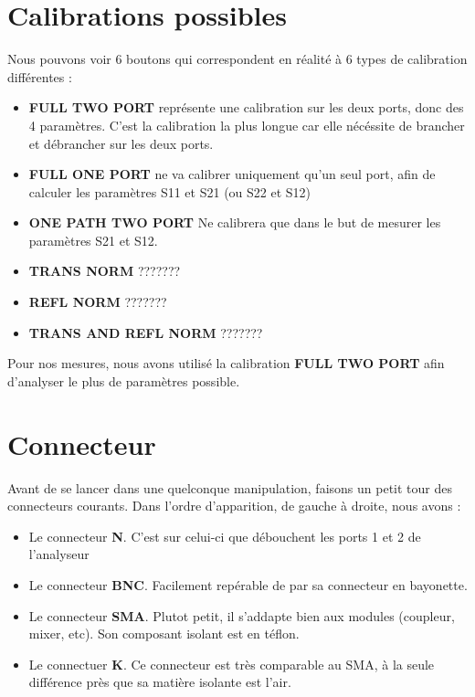 \documentclass[a4paper,12pt]{report}            %
\begin{document}
\newpage

\section{Calibrations possibles}
Nous pouvons voir 6 boutons qui correspondent en réalité à 6 types de calibration
différentes :
\begin{itemize}
	\item \textbf{FULL TWO PORT} représente une calibration sur les deux ports, donc des 4 paramètres.
	      C'est la calibration la plus longue car elle nécéssite de brancher et débrancher sur les deux ports.
	\item \textbf{FULL ONE PORT} ne va calibrer uniquement qu'un seul port, afin de calculer les paramètres
	      S11 et S21 (ou S22 et S12)
	\item \textbf{ONE PATH TWO PORT} Ne calibrera que dans le but de mesurer les paramètres S21 et S12.
	\item \textbf{TRANS NORM} ???????
	\item \textbf{REFL NORM} ???????
	\item \textbf{TRANS AND REFL NORM} ???????
\end{itemize}
Pour nos mesures, nous avons utilisé la calibration \textbf{FULL TWO PORT} afin
d'analyser le plus de paramètres possible.  

\section{Connecteur}

Avant de se lancer dans une quelconque manipulation, faisons un petit tour des connecteurs
courants. Dans l'ordre d'apparition, de gauche à droite, nous avons :
\begin{itemize}
	\item Le connecteur \textbf{N}. C'est sur celui-ci que débouchent les ports 1 et 2 de l'analyseur
	\item Le connecteur \textbf{BNC}. Facilement repérable de par sa connecteur en bayonette.
	\item Le connecteur \textbf{SMA}. Plutot petit, il s'addapte bien aux modules (coupleur, mixer, etc). Son
	      composant isolant est en téflon.
	\item Le connectuer \textbf{K}. Ce connecteur est très comparable au SMA, à la seule différence près
	      que sa matière isolante est l'air.
\end{itemize}
\end{document}
